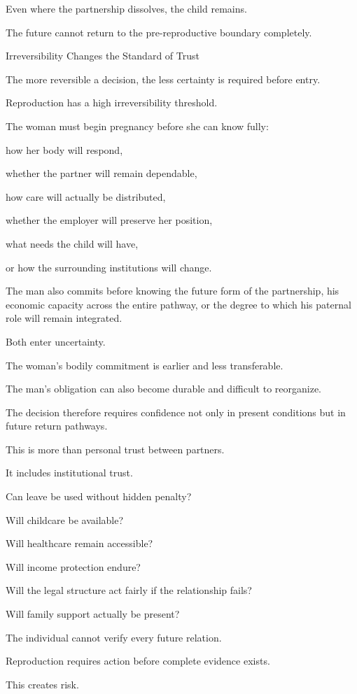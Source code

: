 Even where the partnership dissolves, the child remains.

The future cannot return to the pre-reproductive boundary completely.

Irreversibility Changes the Standard of Trust

The more reversible a decision, the less certainty is required before entry.

Reproduction has a high irreversibility threshold.

The woman must begin pregnancy before she can know fully:

how her body will respond,

whether the partner will remain dependable,

how care will actually be distributed,

whether the employer will preserve her position,

what needs the child will have,

or how the surrounding institutions will change.

The man also commits before knowing the future form of the partnership, his economic capacity across the entire pathway, or the degree to which his paternal role will remain integrated.

Both enter uncertainty.

The woman’s bodily commitment is earlier and less transferable.

The man’s obligation can also become durable and difficult to reorganize.

The decision therefore requires confidence not only in present conditions but in future return pathways.

This is more than personal trust between partners.

It includes institutional trust.

Can leave be used without hidden penalty?

Will childcare be available?

Will healthcare remain accessible?

Will income protection endure?

Will the legal structure act fairly if the relationship fails?

Will family support actually be present?

The individual cannot verify every future relation.

Reproduction requires action before complete evidence exists.

This creates risk.

